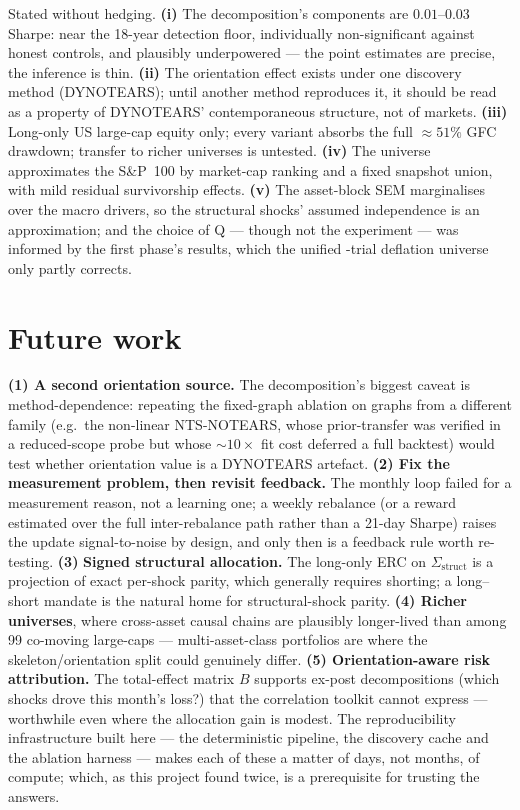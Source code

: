 Stated without hedging. \textbf{(i)} The decomposition's components are
$0.01$--$0.03$ Sharpe: near the 18-year detection floor, individually
non-significant against honest controls, and plausibly underpowered ---
the point estimates are precise, the inference is thin. \textbf{(ii)} The
orientation effect exists under one discovery method (DYNOTEARS); until
another method reproduces it, it should be read as a property of DYNOTEARS'
contemporaneous structure, not of markets. \textbf{(iii)} Long-only US
large-cap equity only; every variant absorbs the full ${\approx}51\%$ GFC
drawdown; transfer to richer universes is untested. \textbf{(iv)} The
universe approximates the S\&P~100 by market-cap ranking and a fixed
snapshot union, with mild residual survivorship effects. \textbf{(v)} The
asset-block SEM marginalises over the macro drivers, so the structural
shocks' assumed independence is an approximation; and the choice of Q ---
though not the experiment --- was informed by the first phase's results,
which the unified \rsNtrials-trial deflation universe only partly corrects.

\section{Future work}
\label{sec:future}

\textbf{(1) A second orientation source.} The decomposition's biggest caveat
is method-dependence: repeating the fixed-graph ablation on graphs from a
different family (e.g.\ the non-linear NTS-NOTEARS, whose prior-transfer was
verified in a reduced-scope probe but whose ${\sim}10\times$ fit cost
deferred a full backtest) would test whether orientation value is a
DYNOTEARS artefact. \textbf{(2) Fix the measurement problem, then revisit
feedback.} The monthly loop failed for a measurement reason, not a learning
one; a weekly rebalance (or a reward estimated over the full inter-rebalance
path rather than a 21-day Sharpe) raises the update signal-to-noise by
design, and only then is a feedback rule worth re-testing. \textbf{(3)}
\textbf{Signed structural allocation.} The long-only ERC on
$\Sigma_{\mathrm{struct}}$ is a projection of exact per-shock parity, which
generally requires shorting; a long--short mandate is the natural home for
structural-shock parity. \textbf{(4) Richer universes}, where cross-asset
causal chains are plausibly longer-lived than among 99 co-moving large-caps
--- multi-asset-class portfolios are where the skeleton/orientation split
could genuinely differ. \textbf{(5) Orientation-aware risk attribution.} The
total-effect matrix $B$ supports ex-post decompositions (which shocks drove
this month's loss?) that the correlation toolkit cannot express ---
worthwhile even where the allocation gain is modest. The reproducibility
infrastructure built here --- the deterministic pipeline, the discovery cache
and the ablation harness --- makes each of these a matter of days, not
months, of compute; which, as this project found twice, is a prerequisite
for trusting the answers.
